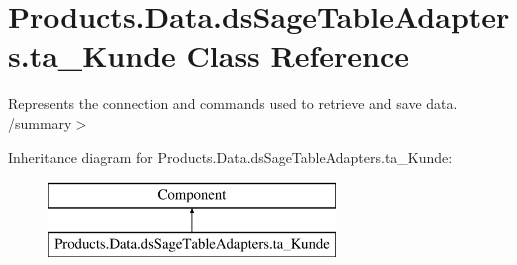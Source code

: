 \hypertarget{class_products_1_1_data_1_1ds_sage_table_adapters_1_1ta___kunde}{}\section{Products.\+Data.\+ds\+Sage\+Table\+Adapters.\+ta\+\_\+\+Kunde Class Reference}
\label{class_products_1_1_data_1_1ds_sage_table_adapters_1_1ta___kunde}


Represents the connection and commands used to retrieve and save data. /summary$>$  


Inheritance diagram for Products.\+Data.\+ds\+Sage\+Table\+Adapters.\+ta\+\_\+\+Kunde\+:\begin{figure}[H]
\begin{center}
\leavevmode
\includegraphics[height=2.000000cm]{class_products_1_1_data_1_1ds_sage_table_adapters_1_1ta___kunde}
\end{center}
\end{figure}

